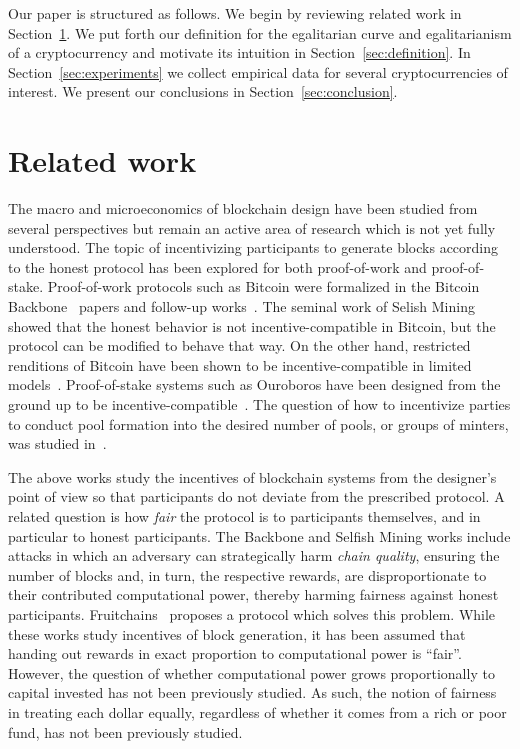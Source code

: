 Our paper is structured as follows. We begin by reviewing related work in
Section~\ref{sec:related}. We put forth our definition for the egalitarian curve
and egalitarianism of a cryptocurrency and motivate its intuition in
Section~\ref{sec:definition}. In Section~\ref{sec:experiments} we collect
empirical data for several cryptocurrencies of interest. We present our
conclusions in Section~\ref{sec:conclusion}.

\section{Related work}\label{sec:related}
The macro and microeconomics of blockchain design have
been studied from several perspectives but remain an active area of research
which is not yet fully understood. The topic of incentivizing participants to
generate blocks according to the honest protocol has been explored for both
proof-of-work and proof-of-stake. Proof-of-work protocols such as Bitcoin were
formalized in the Bitcoin Backbone~\cite{backbone1,backbone2} papers and
follow-up works~\cite{pass}. The seminal work of Selish Mining~\cite{selfish}
showed that the honest behavior is not incentive-compatible in Bitcoin, but the
protocol can be modified to behave that way. On the other hand, restricted
renditions of Bitcoin have been shown to be incentive-compatible in limited
models~\cite{tselekounis-kiayias}. Proof-of-stake systems such as Ouroboros
have been designed from the ground up to be
incentive-compatible~\cite{ouroboros}. The question of how to incentivize
parties to conduct pool formation into the desired number of pools, or groups of minters, was studied
in~\cite{stouka-koutsoupias-kiayias}.

The above works study the incentives of blockchain systems from the designer's
point of view so that participants do not deviate from the prescribed protocol.
A related question is how \emph{fair} the protocol is to participants
themselves, and in particular to honest participants. The Backbone and Selfish
Mining works include attacks in which an adversary can strategically harm
\emph{chain quality}, ensuring the number of blocks and, in turn, the respective
rewards, are disproportionate to their contributed computational power, thereby
harming fairness against honest participants. Fruitchains~\cite{fruitchains}
proposes a protocol which solves this problem.
While these works study incentives of block generation, it has been
assumed that handing out rewards in exact proportion to computational power is
``fair''. However, the question of whether computational power grows proportionally
to capital invested has not been previously studied. As such, the notion of
fairness in treating each dollar equally, regardless of whether it comes from a
rich or poor fund, has not been previously studied.

